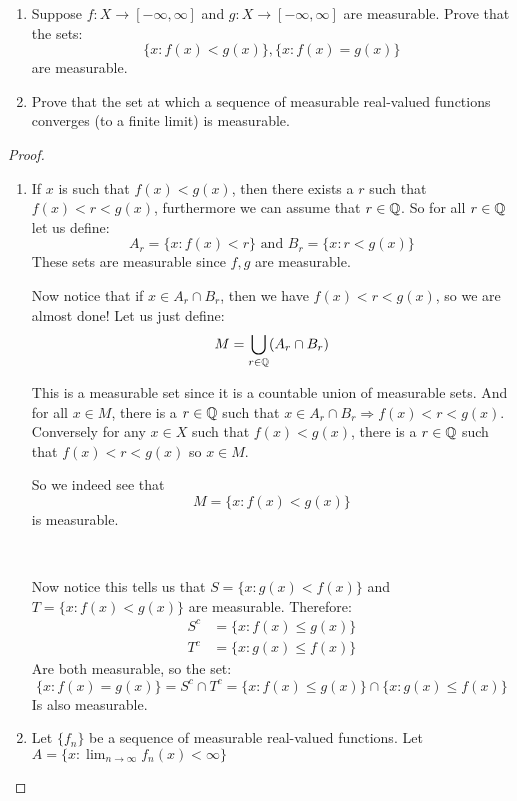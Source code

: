     \begin{exercise}
        \begin{enumerate}[label = (\alph*)]
            \item Suppose $f\colon X\rightarrow [-\infty,\infty]$ and $g\colon X\rightarrow [-\infty, \infty]$ are measurable. Prove that the sets:\[
                \{x\colon f(x)<g(x)\}, \{x\colon f(x) = g(x)\}    
            \] are measurable.
            \item Prove that the set at which a sequence of measurable real-valued functions converges (to a finite limit) is measurable.
        \end{enumerate}
\begin{proof}
    \begin{enumerate}[label = (\alph*)]
        \item If $x$ is such that $f(x)<g(x)$, then there exists a $r$ such that $f(x)<r<g(x)$, furthermore we can assume that $r\in \mathbb{Q}$. So for all $r\in \mathbb{Q}$ let us define:\begin{equation*}
            A_r = \{x\colon f(x)<r\} \text{ and } B_r = \{x\colon r<g(x)\}
        \end{equation*}
        These sets are measurable since $f,g$ are measurable.

        Now notice that if $x\in A_r\cap B_r$, then we have $f(x)<r<g(x)$, so we are almost done! Let us just define:\begin{equation*}
            M = \bigcup_{r\in \mathbb{Q}}(A_r\cap B_r)
        \end{equation*}

        This is a measurable set since it is a countable union of measurable sets. And for all $x\in M$, there is a $r\in \mathbb{Q}$ such that $x\in A_r\cap B_r \Rightarrow f(x)<r<g(x)$. Conversely for any $x\in X$ such that $f(x)<g(x)$, there is a $r\in \mathbb{Q}$ such that $f(x)<r<g(x)$ so $x\in M$.

        So we indeed see that \[M = \{x\colon f(x)<g(x)\}\] is measurable.

        \

        Now notice this tells us that $S = \{x\colon g(x)<f(x)\}$ and $T = \{x\colon f(x)<g(x)\}$ are measurable. Therefore:\begin{align*}
            S^c &= \{x\colon f(x)\leq g(x)\}\\
            T^c &= \{x\colon g(x)\leq f(x)\}
        \end{align*}
        Are both measurable, so the set:\[\{x\colon f(x) = g(x)\} = S^c\cap T^c = \{x\colon f(x)\leq g(x)\}\cap\{x\colon g(x)\leq f(x)\}\] Is also measurable.
    
        \item Let $\{f_n\}$ be a sequence of measurable real-valued functions. Let $A = \{x\colon \lim_{n\rightarrow \infty}f_n(x)<\infty\}$
    \end{enumerate}
\end{proof}
    \end{exercise}
 